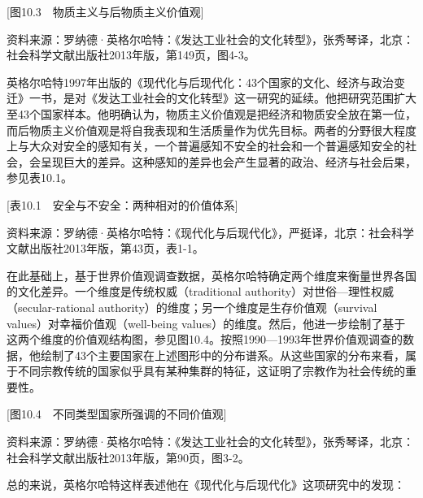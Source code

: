 [图10.3　物质主义与后物质主义价值观]

资料来源：罗纳德·英格尔哈特：《发达工业社会的文化转型》，张秀琴译，北京：社会科学文献出版社2013年版，第149页，图4-3。

英格尔哈特1997年出版的《现代化与后现代化：43个国家的文化、经济与政治变迁》一书，是对《发达工业社会的文化转型》这一研究的延续。他把研究范围扩大至43个国家样本。他明确认为，物质主义价值观是把经济和物质安全放在第一位，而后物质主义价值观是将自我表现和生活质量作为优先目标。两者的分野很大程度上与大众对安全的感知有关，一个普遍感知不安全的社会和一个普遍感知安全的社会，会呈现巨大的差异。这种感知的差异也会产生显著的政治、经济与社会后果，参见表10.1。

[表10.1　安全与不安全：两种相对的价值体系]

资料来源：罗纳德·英格尔哈特：《现代化与后现代化》，严挺译，北京：社会科学文献出版社2013年版，第43页，表1-1。

在此基础上，基于世界价值观调查数据，英格尔哈特确定两个维度来衡量世界各国的文化差异。一个维度是传统权威（traditional authority）对世俗—理性权威（secular-rational authority）的维度；另一个维度是生存价值观（survival values）对幸福价值观（well-being values）的维度。然后，他进一步绘制了基于这两个维度的价值观结构图，参见图10.4。按照1990—1993年世界价值观调查的数据，他绘制了43个主要国家在上述图形中的分布谱系。从这些国家的分布来看，属于不同宗教传统的国家似乎具有某种集群的特征，这证明了宗教作为社会传统的重要性。

[图10.4　不同类型国家所强调的不同价值观]

资料来源：罗纳德·英格尔哈特：《发达工业社会的文化转型》，张秀琴译，北京：社会科学文献出版社2013年版，第90页，图3-2。

总的来说，英格尔哈特这样表述他在《现代化与后现代化》这项研究中的发现：


